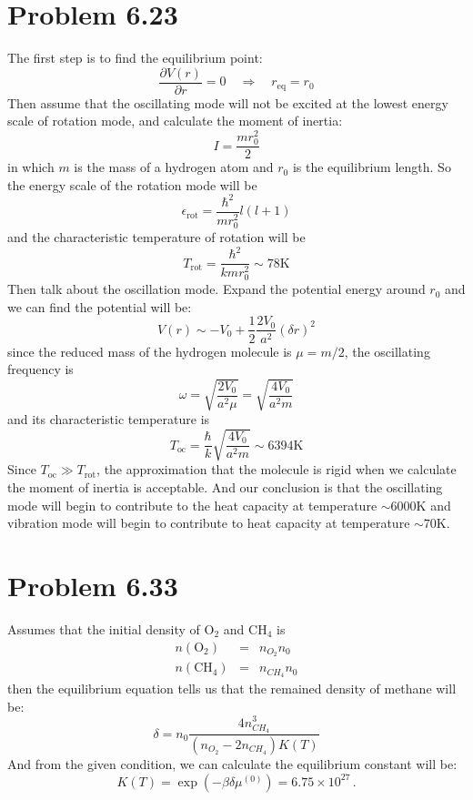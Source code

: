 \documentclass{article}
\begin{document}
\section*{Problem 6.23}
The first step is to find the equilibrium point:
$$
\frac{\partial V(r)}{\partial r} = 0\quad\Rightarrow\quad r_{\mathrm{eq}} = r_0 
$$
Then assume that the oscillating mode will not be excited at the lowest energy scale of rotation mode, and calculate the moment of inertia:
$$
I = \frac{mr_0^2}{2}
$$
in which $m$ is the mass of a hydrogen atom and $r_0$ is the equilibrium length. So the energy scale of the rotation mode will be
\begin{equation}
\epsilon_{\mathrm{rot}} = \frac{\hbar^2}{mr_0^2}l(l+1)
\end{equation}
and the characteristic temperature of rotation will be
$$
T_{\mathrm{rot}} = \frac{\hbar^2}{kmr_0^2} \sim 78\mathrm{K}
$$
Then talk about the oscillation mode. Expand the potential energy around $r_0$ and we can find the potential will be:
\begin{equation}
V(r)\sim -V_0 + \frac{1}{2}\frac{2V_0}{a^2}(\delta r)^2
\end{equation}
since the reduced mass of the hydrogen molecule is $\mu = m/2$, the oscillating frequency is
\begin{equation}
\omega = \sqrt{\frac{2V_0}{a^2\mu}} = \sqrt{\frac{4V_0}{a^2 m}}
\end{equation}
and its characteristic temperature is
$$
T_{\mathrm{oc}} = \frac{\hbar}{k}\sqrt{\frac{4V_0}{a^2 m}}\sim 6394\mathrm{K}
$$
Since $T_{\mathrm{oc}}\gg T_\mathrm{rot}$, the approximation that the molecule is rigid when we calculate the moment of inertia is acceptable. And our conclusion is that the oscillating mode will begin to contribute to the heat capacity at temperature $\sim 6000\mathrm{K}$ and vibration mode will begin to contribute to heat capacity at temperature $\sim 70\mathrm{K}$.

\section*{Problem 6.33}
Assumes that the initial density of $\mathrm{O}_2$ and $\mathrm{CH}_4$ is 
\begin{eqnarray*}
n(\mathrm{O}_2) &=& n_{O_2}n_0\\
n(\mathrm{CH}_4)&=& n_{CH_4}n_0
\end{eqnarray*}
then the equilibrium equation tells us that the remained density of methane will be:
\begin{equation}
\delta = n_0 \frac{4n_{CH_4}^3}{(n_{O_2}-2n_{CH_4})K(T)}
\end{equation}
And from the given condition, we can calculate the equilibrium constant will be:
\begin{equation}
K(T) = \exp\left(-\beta \delta \mu^{(0)}\right) = 6.75\times 10^{27}\,.
\end{equation}
\end{document}

